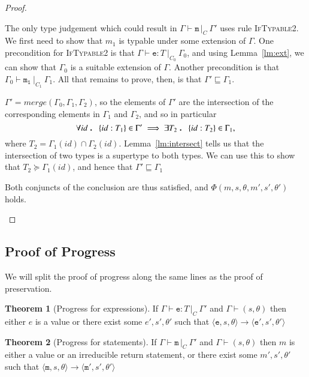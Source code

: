 \documentclass[12pt,a4paper,twoside,openright]{report}
\theoremstyle{definition}
\theoremstyle{dotless}
\newtheorem{theorem}{Theorem}[section]
\newcommand{\typable}[2][ ]{\Gamma{}\vdash\mathtt{#2}\, |_C#1\:\Gamma#1'}
\newcommand{\typed}[2]{\Gamma{}\vdash\mathtt{#1}: #2\,|_C\:\Gamma'}
\newcommand{\transition}[6]{\langle{}\mathtt{#1},#2,#3\rangle{}\rightarrow{}\langle{}\mathtt{#4},#5,#6\rangle}
\newcommand\qdot{\mathbin{\scalebox{1.5}{.}}\enspace}
\begin{document}
\begin{proof}
\begin{case}[If2]
	The only type judgement which could result in $\typable{m}$ uses rule
	\textsc{IfTypable2}. We first need to show that $m_1$ is typable under some
	extension of $\Gamma$. One precondition for \textsc{IfTypable2} is that
	$\Gamma\vdash\mathtt{e}:T\ |_{C_0}\ \Gamma_0$, and using
	Lemma~\ref{lm:ext}, we can show that $\Gamma_0$ is a suitable extension of
	$\Gamma$. Another precondition is that $\Gamma_0\vdash\mathtt{m_1}\ |_{C_1}\
	\Gamma_1$. All that remains to prove, then, is that
	$\Gamma'\sqsubseteq\Gamma_1$.

	$\Gamma'=merge(\Gamma_0,\Gamma_1,\Gamma_2)$, so the elements of $\Gamma'$
	are the intersection of the corresponding elements in $\Gamma_1$ and
	$\Gamma_2$, and so in particular $$\forall id\qdot \{id:T_1\}\in\Gamma'
	\implies \exists T_2 \qdot \{id:T_2\}\in\Gamma_1,$$ where $T_2 =
	\Gamma_1(id)\cap\Gamma_2(id)$. Lemma~\ref{lm:intersect} tells us that the
	intersection of two types is a supertype to both types. We can use this to
	show that $T_2\succeq\Gamma_1(id)$, and hence that
	$\Gamma'\sqsubseteq\Gamma_1$

	Both conjuncts of the conclusion are thus satisfied, and $\Phi(m,s,\theta,m',s',\theta')$ holds.

  \end{case} 

\end{proof}

\subsection{Proof of Progress}

We will split the proof of progress along the same lines as the proof of
preservation.

\begin{theorem}[Progress for expressions]\label{expProgress} If
  $\typed{e}{T}$ and $\Gamma \vdash (s, \theta)$ then either $e$ is a value or
  there exist some $e',s', \theta'$ such that
  $\transition{e}{s}{\theta}{e'}{s'}{\theta'}$ \end{theorem}
\begin{theorem}[Progress for statements]\label{mProgress}
  If $\typable{m}$ and $\Gamma \vdash (s, \theta)$ then $m$ is either a
  value or an irreducible return statement, or there exist some $m',s', \theta'$ such that
  $\transition{m}{s}{\theta}{m'}{s'}{\theta'}$ 
\end{theorem}
\end{document}
